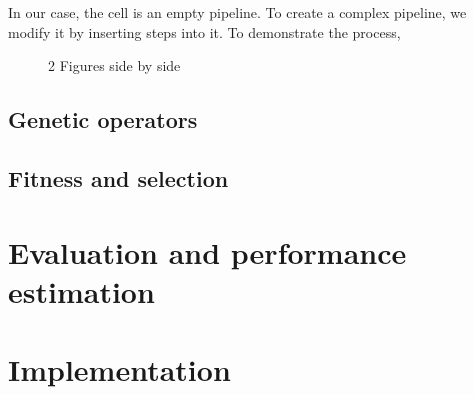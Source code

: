 In our case, the cell is an empty pipeline. To create a complex pipeline, we
modify it by inserting steps into it. To demonstrate the process, 
\begin{figure}[h]\centering
    \qquad
    \caption{2 Figures side by side}%
    \label{fig:example}%
\end{figure}

\subsection{Genetic operators}

\subsection{Fitness and selection}

\section{Evaluation and performance estimation}

\section{Implementation}